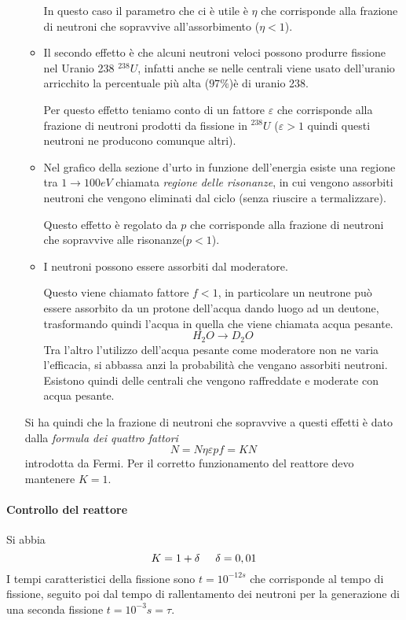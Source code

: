 \begin{enumerate}
\begin{itemize}
In questo caso il parametro che ci è utile è $\eta$ che corrisponde alla frazione di neutroni che sopravvive all'assorbimento ($\eta<1$).

\item Il secondo effetto è che alcuni neutroni veloci possono produrre fissione nel Uranio 238 $^{238}U$, infatti anche se nelle centrali viene usato dell'uranio arricchito la percentuale più alta ($97\%$)è di uranio 238.

Per questo effetto teniamo conto di un fattore $\varepsilon$ che corrisponde alla frazione di neutroni prodotti da fissione in $^{238}U$ ($\varepsilon>1$ quindi questi neutroni ne producono comunque altri).

\item Nel grafico della sezione d'urto in funzione dell'energia esiste una regione tra $1\to 100eV$ chiamata \emph{regione delle risonanze}, in cui vengono assorbiti neutroni che vengono eliminati dal ciclo (senza riuscire a termalizzare).

Questo effetto è regolato da $p$ che corrisponde alla frazione di neutroni che sopravvive alle risonanze($p<1$).

\item I neutroni possono essere assorbiti dal moderatore.

Questo viene chiamato fattore $f<1$, in particolare un neutrone può essere assorbito da un protone dell'acqua dando luogo ad un deutone, trasformando quindi l'acqua in quella che viene chiamata acqua pesante.
\[
H_2O\to D_2O
\]
Tra l'altro l'utilizzo dell'acqua pesante come moderatore non ne varia l'efficacia, si abbassa anzi la probabilità che vengano assorbiti neutroni.
Esistono quindi delle centrali che vengono raffreddate e moderate con acqua pesante.
\end{itemize}
Si ha quindi che la frazione di neutroni che sopravvive a questi effetti è dato dalla \emph{formula dei quattro fattori}
\begin{equation}
N=N\eta\varepsilon p f=KN
\end{equation}
introdotta da Fermi.
Per il corretto funzionamento del reattore devo mantenere $K=1$.
\end{enumerate}

\paragraph{Controllo del reattore}
Si abbia
\[
K=1+\delta\hspace{0.5cm}\delta=0,01
\]
I tempi caratteristici della fissione sono $t=10^{-12s}$ che corrisponde al tempo di fissione, seguito poi dal tempo di rallentamento dei neutroni per la generazione di una seconda fissione $t=10^{-3}s=\tau$.

